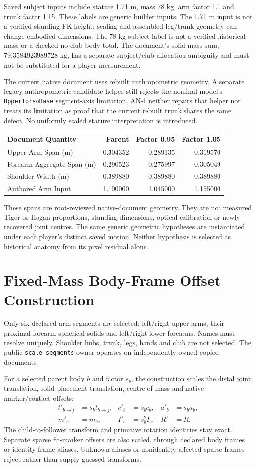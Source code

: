 \documentclass[11pt,letterpaper]{article}
\newcommand{\code}[1]{\nolinkurl{#1}}\newcommand{\hash}[1]{{\footnotesize\nolinkurl{#1}}}
\newcommand{\chapterpage}[1]{\clearpage\section{#1}}
\begin{document}
Saved subject inputs include stature 1.71 m, mass 78 kg, arm factor 1.1 and trunk factor 1.15. These labels are generic builder inputs. The 1.71 m input is not a verified standing FK height; scaling and assembled leg/trunk geometry can change embodied dimensions. The 78 kg subject label is not a verified historical mass or a checked no-club body total. The document's solid-mass sum, 79.3584923989728 kg, has a separate subject/club allocation ambiguity and must not be substituted for a player measurement.

The current native document uses rebuilt anthropometric geometry. A separate legacy anthropometric candidate helper still rejects the nominal model's \code{UpperTorsoBase} segment-axis limitation. AN-1 neither repairs that helper nor treats its limitation as proof that the current rebuilt trunk shares the same defect. No uniformly scaled stature interpretation is introduced.

\begin{tabular}{@{}lrrr@{}}\toprule
Document Quantity & Parent & Factor 0.95 & Factor 1.05\\\midrule
Upper-Arm Span (m) & 0.304352 & 0.289135 & 0.319570\\
Forearm Aggregate Span (m) & 0.290523 & 0.275997 & 0.305049\\
Shoulder Width (m) & 0.389880 & 0.389880 & 0.389880\\
Authored Arm Input & 1.100000 & 1.045000 & 1.155000\\\bottomrule
\end{tabular}

These spans are root-reviewed native-document geometry. They are not measured Tiger or Hogan proportions, standing dimensions, optical calibration or newly recovered joint centres. The same generic geometric hypotheses are instantiated under each player's distinct saved motion. Neither hypothesis is selected as historical anatomy from its pixel residual alone.

\chapterpage{Fixed-Mass Body-Frame Offset Construction}
Only six declared arm segments are selected: left/right upper arms, their proximal forearm spherical solids and left/right lower forearms. Names must resolve uniquely. Shoulder hubs, trunk, legs, hands and club are not selected. The public \code{scale_segments} owner operates on independently owned copied documents.

For a selected parent body $b$ and factor $s_b$, the construction scales the distal joint translation, solid placement translation, centre of mass and native marker/contact offsets:
\begin{align}
 t'_{b\to j}&=s_b t_{b\to j}, & c'_b&=s_b c_b, & a'_b&=s_b a_b,\\
 m'_b&=m_b, & I'_b&=s_b^2 I_b, & R'&=R.
\end{align}
The child-to-follower transform and primitive rotation identities stay exact. Separate sparse fit-marker offsets are also scaled, through declared body frames or identity frame aliases. Unknown aliases or nonidentity affected sparse frames reject rather than supply guessed transforms.
\end{document}
